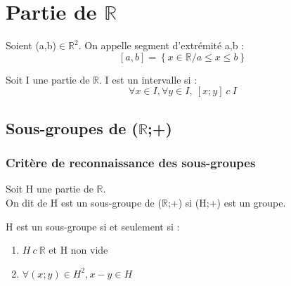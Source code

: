 \section{Partie de $\mathbb{R}$}
\begin{de}
 Soient (a,b)$\in \mathbb{R}^2$. On appelle segment d'extrémité a,b :
$$[a,b] = \left\lbrace x\in \mathbb{R} / a\leq x \leq b\right\rbrace $$
\end{de}
\begin{de}
 Soit I une partie de $\mathbb{R}$. I est un intervalle si :
$$\forall x\in I, \forall y \in I,~ [x;y]~c~I$$
\end{de}
\subsection{Sous-groupes de ($\mathbb{R}$;+)}
\subsubsection{Critère de reconnaissance des sous-groupes}
\begin{de}
Soit H une partie de $\mathbb{R}$.\\
On dit de H est un sous-groupe de ($\mathbb{R}$;+) si (H;+) est un groupe. 
\end{de}
\begin{prop}
H est un sous-groupe si et seulement si :
\begin{enumerate}[1-]
 \item $H~ c~ \mathbb{R}$ et H non vide
 \item $\forall(x;y)\in H^2, x-y\in H$
\end{enumerate}

\end{prop}

